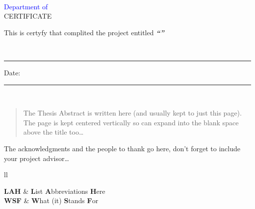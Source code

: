 \documentclass[
11pt, english, singlespacing, headsepline,oneside]{Documantation}
\begin{document}
\begin{certificate}
	\begin{center}
		\LARGE
		\textcolor{blue}{\univname} \\
		\large
	 	\textcolor{blue}{Department of {\deptname}}\\ [2cm]
		 \huge{\MakeUppercase{Certificate}} \\ [1cm]
	\end{center}
	This is certyfy that \textbf{\authorname} complited the project entitled \textbf{\textit{\enquote{\ttitle}}} 
	
	\vfill 
	\noindent {\examname} \\
	\rule[0.5em]{25em}{0.5pt} %
	 
	\noindent Date:\\
	\rule[0.5em]{25em}{0.5pt} %
	\\[4cm]
\end{certificate}


\begin{abstract}
\addchaptertocentry{\abstractname} %
The Thesis Abstract is written here (and usually kept to just this page). The page is kept centered vertically so can expand into the blank space above the title too\ldots
\end{abstract}


\begin{acknowledgements}
\addchaptertocentry{\acknowledgementname} %
The acknowledgments and the people to thank go here, don't forget to include your project advisor\ldots
\end{acknowledgements}


\begin{abbreviations}{ll} %


\textbf{LAH} & \textbf{L}ist \textbf{A}bbreviations \textbf{H}ere\\
\textbf{WSF} & \textbf{W}hat (it) \textbf{S}tands \textbf{F}or\\

\end{abbreviations}


\listoffigures %

\end{document}
